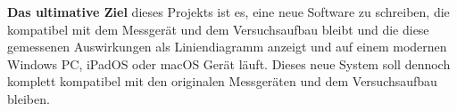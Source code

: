 \textbf{Das ultimative Ziel} dieses Projekts ist es, eine neue Software zu schreiben, die kompatibel mit dem Messgerät und dem Versuchsaufbau bleibt und die diese gemessenen Auswirkungen als Liniendiagramm anzeigt und auf einem modernen Windows \ac{PC}, iPadOS oder macOS Gerät läuft. Dieses neue System soll dennoch komplett kompatibel mit den originalen Messgeräten und dem Versuchsaufbau bleiben.



